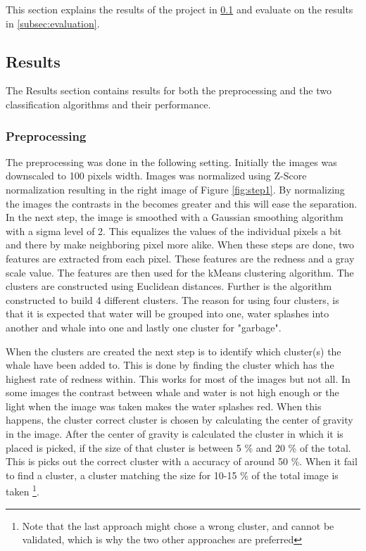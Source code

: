 This section explains the results of the project in \ref{subsec:results} and evaluate on the results in \ref{subsec:evaluation}.

\subsection{Results}
\label{subsec:results}
The Results section contains results for both the preprocessing and the two classification algorithms and their performance.


\subsubsection{Preprocessing}
The preprocessing was done in the following setting.
Initially the images was downscaled to 100 pixels width.
Images was normalized using Z-Score normalization resulting in the right image of Figure \ref{fig:step1}. By normalizing the images the contrasts in the becomes greater and this will ease the separation.
In the next step, the image is smoothed with a Gaussian smoothing algorithm with a sigma level of 2. This equalizes the values of the individual pixels a bit and there by make neighboring pixel more alike.
When these steps are done, two features are extracted from each pixel.
These features are the redness and a gray scale value.
The features are then used for the kMeans clustering algorithm.
The clusters are constructed using Euclidean distances. Further is the algorithm constructed to build 4 different clusters.
The reason for using four clusters, is that it is expected that water will be grouped into one, water splashes into another and whale into one and lastly one cluster for "garbage". 

When the clusters are created the next step  is to identify which cluster(s) the whale have been added to.
This is done by finding the cluster which has the highest rate of redness within. This works for most of the images but not all. In some images the contrast between whale and water is not high enough or the light when the image was taken makes the water splashes red. When this happens, the cluster correct cluster is chosen by calculating the center of gravity in the image. After the center of gravity is calculated the cluster in which it is placed is picked, if the size of that cluster is between 5 \% and 20 \% of the total. This is picks out the correct cluster with a accuracy of around 50 \%.
When it fail to find a cluster, a cluster matching the size for 10-15 \% of the total image is taken \footnote{Note that the last approach might chose a wrong cluster, and cannot be validated, which is why the two other approaches are preferred}. 

